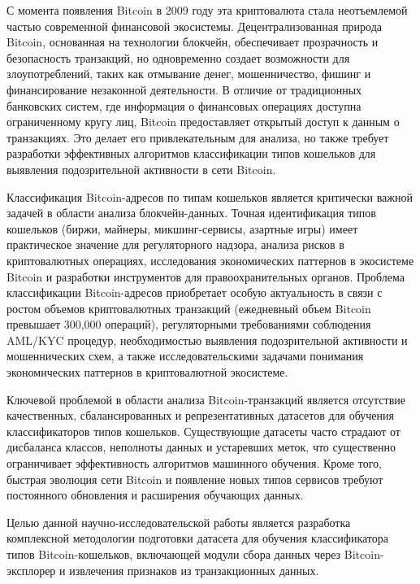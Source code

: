 \introduction %

С момента появления Bitcoin в 2009 году эта криптовалюта стала неотъемлемой частью современной финансовой экосистемы. Децентрализованная природа Bitcoin, основанная на технологии блокчейн, обеспечивает прозрачность и безопасность транзакций, но одновременно создает возможности для злоупотреблений, таких как отмывание денег, мошенничество, фишинг и финансирование незаконной деятельности. В отличие от традиционных банковских систем, где информация о финансовых операциях доступна ограниченному кругу лиц, Bitcoin предоставляет открытый доступ к данным о транзакциях. Это делает его привлекательным для анализа, но также требует разработки эффективных алгоритмов классификации типов кошельков для выявления подозрительной активности в сети Bitcoin.

Классификация Bitcoin-адресов по типам кошельков является критически важной задачей в области анализа блокчейн-данных. Точная идентификация типов кошельков (биржи, майнеры, микшинг-сервисы, азартные игры) имеет практическое значение для регуляторного надзора, анализа рисков в криптовалютных операциях, исследования экономических паттернов в экосистеме Bitcoin и разработки инструментов для правоохранительных органов. Проблема классификации Bitcoin-адресов приобретает особую актуальность в связи с ростом объемов криптовалютных транзакций (ежедневный объем Bitcoin превышает 300,000 операций), регуляторными требованиями соблюдения AML/KYC процедур, необходимостью выявления подозрительной активности и мошеннических схем, а также исследовательскими задачами понимания экономических паттернов в криптовалютной экосистеме.

Ключевой проблемой в области анализа Bitcoin-транзакций является отсутствие качественных, сбалансированных и репрезентативных датасетов для обучения классификаторов типов кошельков. Существующие датасеты часто страдают от дисбаланса классов, неполноты данных и устаревших меток, что существенно ограничивает эффективность алгоритмов машинного обучения. Кроме того, быстрая эволюция сети Bitcoin и появление новых типов сервисов требуют постоянного обновления и расширения обучающих данных.

Целью данной научно-исследовательской работы является разработка комплексной методологии подготовки датасета для обучения классификатора типов Bitcoin-кошельков, включающей модули сбора данных через Bitcoin-эксплорер и извлечения признаков из транзакционных данных.

